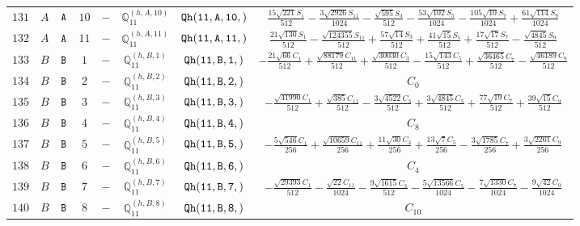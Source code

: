 \documentclass[fleqn,8pt]{jsarticle}
\begin{document}
\begin{table}[ht!]
\begin{center}
\begin{tabular}{cccccccc}
$ 131 $ & $ A $ & $ {\tt A} $ & $ 10 $ & $ - $ & $ \mathbb{Q}_{11}^{(h,A,10)} $ & $ {\tt Qh(11,A,10,)} $ & $ \frac{15 \sqrt{221} S_{1}}{512} - \frac{3 \sqrt{2926} S_{11}}{1024} - \frac{\sqrt{595} S_{3}}{512} - \frac{53 \sqrt{102} S_{5}}{1024} - \frac{105 \sqrt{10} S_{7}}{1024} + \frac{61 \sqrt{114} S_{9}}{1024} $ \\
$ 132 $ & $ A $ & $ {\tt A} $ & $ 11 $ & $ - $ & $ \mathbb{Q}_{11}^{(h,A,11)} $ & $ {\tt Qh(11,A,11,)} $ & $ \frac{21 \sqrt{130} S_{1}}{512} - \frac{\sqrt{124355} S_{11}}{512} + \frac{57 \sqrt{14} S_{3}}{512} + \frac{41 \sqrt{15} S_{5}}{512} + \frac{17 \sqrt{17} S_{7}}{512} - \frac{\sqrt{4845} S_{9}}{512} $ \\
$ 133 $ & $ B $ & $ {\tt B} $ & $ 1 $ & $ - $ & $ \mathbb{Q}_{11}^{(h,B,1)} $ & $ {\tt Qh(11,B,1,)} $ & $ - \frac{21 \sqrt{66} C_{1}}{512} + \frac{\sqrt{88179} C_{11}}{512} + \frac{\sqrt{30030} C_{3}}{512} - \frac{15 \sqrt{143} C_{5}}{512} + \frac{\sqrt{36465} C_{7}}{512} - \frac{\sqrt{46189} C_{9}}{512} $ \\
$ 134 $ & $ B $ & $ {\tt B} $ & $ 2 $ & $ - $ & $ \mathbb{Q}_{11}^{(h,B,2)} $ & $ {\tt Qh(11,B,2,)} $ & $ C_{0} $ \\
$ 135 $ & $ B $ & $ {\tt B} $ & $ 3 $ & $ - $ & $ \mathbb{Q}_{11}^{(h,B,3)} $ & $ {\tt Qh(11,B,3,)} $ & $ - \frac{\sqrt{41990} C_{1}}{512} + \frac{\sqrt{385} C_{11}}{512} - \frac{3 \sqrt{4522} C_{3}}{512} + \frac{3 \sqrt{4845} C_{5}}{512} + \frac{77 \sqrt{19} C_{7}}{512} + \frac{39 \sqrt{15} C_{9}}{512} $ \\
$ 136 $ & $ B $ & $ {\tt B} $ & $ 4 $ & $ - $ & $ \mathbb{Q}_{11}^{(h,B,4)} $ & $ {\tt Qh(11,B,4,)} $ & $ C_{8} $ \\
$ 137 $ & $ B $ & $ {\tt B} $ & $ 5 $ & $ - $ & $ \mathbb{Q}_{11}^{(h,B,5)} $ & $ {\tt Qh(11,B,5,)} $ & $ - \frac{5 \sqrt{546} C_{1}}{256} + \frac{\sqrt{10659} C_{11}}{256} + \frac{11 \sqrt{30} C_{3}}{256} + \frac{13 \sqrt{7} C_{5}}{256} - \frac{3 \sqrt{1785} C_{7}}{256} + \frac{3 \sqrt{2261} C_{9}}{256} $ \\
$ 138 $ & $ B $ & $ {\tt B} $ & $ 6 $ & $ - $ & $ \mathbb{Q}_{11}^{(h,B,6)} $ & $ {\tt Qh(11,B,6,)} $ & $ C_{4} $ \\
$ 139 $ & $ B $ & $ {\tt B} $ & $ 7 $ & $ - $ & $ \mathbb{Q}_{11}^{(h,B,7)} $ & $ {\tt Qh(11,B,7,)} $ & $ - \frac{\sqrt{29393} C_{1}}{512} - \frac{\sqrt{22} C_{11}}{1024} - \frac{9 \sqrt{1615} C_{3}}{512} - \frac{5 \sqrt{13566} C_{5}}{1024} - \frac{7 \sqrt{1330} C_{7}}{1024} - \frac{9 \sqrt{42} C_{9}}{1024} $ \\
$ 140 $ & $ B $ & $ {\tt B} $ & $ 8 $ & $ - $ & $ \mathbb{Q}_{11}^{(h,B,8)} $ & $ {\tt Qh(11,B,8,)} $ & $ C_{10} $ \\

\end{tabular}
\end{center}
\end{table}
\end{document}
